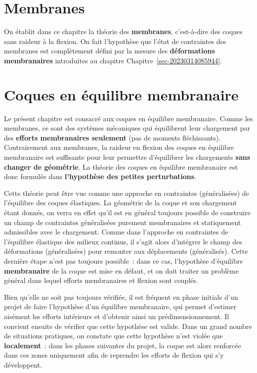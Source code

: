 \documentclass[
  a4paper,
  DIV=11,
  numbers=noendperiod]{scrreprt}
\begin{document}

\hypertarget{sec-20230328142259}{%
\chapter{Membranes}\label{sec-20230328142259}}

On établit dans ce chapitre la théorie des \textbf{membranes},
c'est-à-dire des coques sans raideur à la flexion. On fait l'hypothèse
que l'état de contraintes des membranes est complètement défini par la
mesure des \textbf{déformations membranaires} introduites au chapitre
Chapitre~\ref{sec-20230314085944}.


\hypertarget{coques-en-uxe9quilibre-membranaire}{%
\chapter{Coques en équilibre
membranaire}\label{coques-en-uxe9quilibre-membranaire}}

Le présent chapitre est consacré aux coques en équilibre membranaire.
Comme les membranes, ce sont des systèmes mécaniques qui équilibrent
leur chargement par des \textbf{efforts membranaires seulement} (pas de
moments fléchissants). Contrairement aux membranes, la raideur en
flexion des coques en équilibre membranaire est suffisante pour leur
permettre d'équilibrer les chargements \textbf{sans changer de
géométrie}. La théorie des coques en équilibre membranaire est donc
formulée dans \textbf{l'hypothèse des petites perturbations}.

Cette théorie peut être vue comme une approche en contraintes
(généralisées) de l'équilibre des coques élastiques. La géométrie de la
coque et son chargement étant donnés, on verra en effet qu'il est en
général toujours possible de construire un champ de contraintes
généralisées purement membranaires et statiquement admissibles avec le
chargement. Comme dans l'approche en contraintes de l'équilibre
élastique des milieux continus, il s'agit alors d'intégrer le champ des
déformations (généralisées) pour remonter aux déplacements
(généralisés). Cette dernière étape n'est pas toujours possible~: dans
ce cas, l'hypothèse d'équilibre \textbf{membranaire} de la coque est
mise en défaut, et on doit traiter un problème général dans lequel
efforts membranaires et flexion sont couplés.

Bien qu'elle ne soit pas toujours vérifiée, il est fréquent en phase
initiale d'un projet de faire l'hypothèse d'un équilibre membranaire,
qui permet d'estimer aisément les efforts intérieurs et d'obtenir ainsi
un prédimensionnement. Il convient ensuite de vérifier que cette
hypothèse est valide. Dans un grand nombre de situations pratiques, on
constate que cette hypothèse n'est violée que \textbf{localement}~: dans
les phases suivantes du projet, la coque est alors renforcée dans ces
zones uniquement afin de reprendre les efforts de flexion qui s'y
développent.
\end{document}
